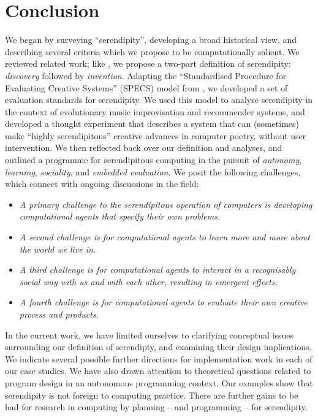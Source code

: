 \section{Conclusion} \label{sec:conclusion}

%
We began by surveying ``serendipity'', developing a broad historical
view, and describing several criteria  which we propose
to be computationally salient.  We reviewed related work; like
, we propose a two-part definition of
serendipity: \emph{discovery} followed by \emph{invention}.
%
Adapting the ``Standardised Procedure for Evaluating Creative
Systems'' (SPECS) model from , we developed a set
of evaluation standards for serendipity.
%
We used this model to analyse serendipity in the context of
evolutionary music improvisation and recommender systems, and
developed a thought experiment that describes a system that can (sometimes) make ``highly serendipitous'' creative advances in computer poetry, without user
intervention.
%
We then reflected back over our definition and analyses, and outlined a programme for
serendipitous computing in the pursuit of \emph{autonomy},
\emph{learning}, \emph{sociality}, and \emph{embedded evaluation}.  We
posit the following challenges, which connect with ongoing discussions
in the field:
%
\begin{itemize}
\item \emph{A primary challenge to the serendipitous operation of
  computers is developing computational agents that specify their own
  problems.}
\item \emph{A second challenge is for computational agents to learn
  more and more about the world we live in.}
\item \emph{A third challenge is for computational agents to interact
  in a recognisably social way with us and with each other, resulting
  in emergent effects.}
\item \emph{A fourth challenge is for computational agents to evaluate
  their own creative process and products.}
\end{itemize}
%
In the current work, we have limited ourselves to clarifying
conceptual issues surrounding our definition of serendipty, and
examining their design implications.
% 
We indicate several possible further directions for implementation
work in each of our case studies.  We have also drawn attention to
theoretical questions related to program design in an autonomous
programming context.  Our examples show that serendipity is not
foreign to computing practice.  There are further gains to be had for
research in computing by planning -- and programming -- for
serendipity.
%

